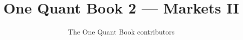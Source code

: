 \documentclass[11pt,a4paper,twoside,openany]{book}
\title{One Quant Book 2 --- Markets II}
\author{The One Quant Book contributors}
\date{\bookdate}
\begin{document}
\frontmatter



\tableofcontents

\mainmatter


\appendix
\part{\omsolutionspart}


\backmatter
\printindex
\end{document}
